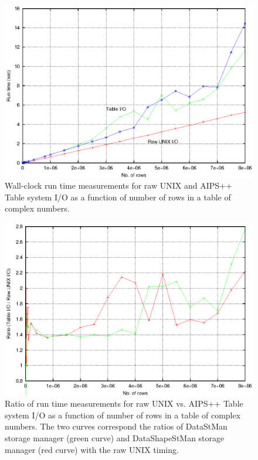 \begin{figure}[h!]
\begin{center}
  \includegraphics[scale=0.9]{runtime.New.eps}
\caption[AIPS++ and raw UNIX I/O performance]{\small Wall-clock run time
measurements for raw UNIX and AIPS++ Table system I/O as a function of
number of rows in a table of complex numbers.}
\label{IOTIME_PLOT}
\end{center}
\end{figure}

\begin{figure}[h!]
\begin{center}
  \includegraphics[scale=0.9]{ratio.New.eps}
\caption[AIPS++ and raw UNIX I/O performance ratios]{\small Ratio of run time
measurements for raw UNIX vs. AIPS++ Table system I/O as a function of
number of rows in a table of complex numbers.  The two curves
correspond the ratios of DataStMan storage manager (green curve) and
DataShapeStMan storage manager (red curve) with the raw UNIX timing.}
\label{IORATIO_PLOT}
\end{center}
\end{figure}

